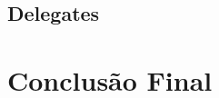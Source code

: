 \documentclass[rel_mlp]{iiufrgs}
\begin{document}
\section{Delegates}

\chapter{Conclusão Final}






%

%



%
%

\end{document}
